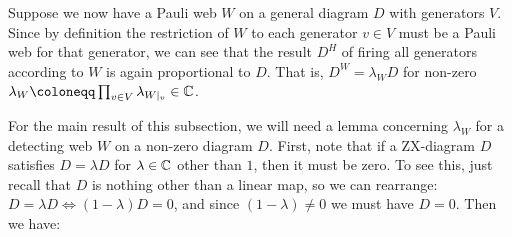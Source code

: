 Suppose we now have a Pauli web $W$ on a general diagram $D$ with generators $V$.
Since by definition the restriction of $W$ to each generator $v \in V$ must be a Pauli web for that generator, we can see that the result $D^{H}$ of firing all generators according to $W$ is again proportional to $D$.
That is, $D^{W} = \lambda_W D$ for non-zero $\lambda_W \coloneqq \prod_{v \in V} \lambda_{W|_v} \in \CC$.

For the main result of this subsection, we will need a lemma concerning $\lambda_W$ for a detecting web $W$ on a non-zero diagram $D$.
First, note that if a ZX-diagram $D$ satisfies $D = \lambda D$ for $\lambda \in \mathbb{C}$ other than $1$, then it must be zero.
To see this, just recall that $D$ is nothing other than a linear map, so we can rearrange: $D = \lambda D \iff (1 - \lambda)D = 0$, and since $(1 - \lambda) \neq 0$ we must have $D = 0$.
Then we have:

